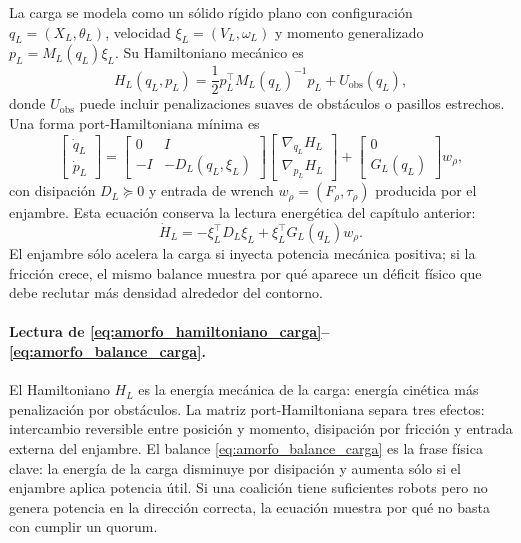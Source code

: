La carga se modela como un sólido rígido plano con configuración
$q_L=(X_L,\theta_L)$, velocidad $\xi_L=(V_L,\omega_L)$ y momento generalizado
$p_L=M_L(q_L)\xi_L$. Su Hamiltoniano mecánico es
\begin{equation}
  H_L(q_L,p_L)=\frac12p_L^\top M_L(q_L)^{-1}p_L+U_{\mathrm{obs}}(q_L),
  \label{eq:amorfo_hamiltoniano_carga}
\end{equation}
donde $U_{\mathrm{obs}}$ puede incluir penalizaciones suaves de obstáculos o pasillos
estrechos. Una forma port-Hamiltoniana mínima es
\begin{equation}
  \begin{bmatrix}\dot q_L\\ \dot p_L\end{bmatrix}
  =
  \left[
  \begin{array}{cc}
    0&I\\ -I&-D_L(q_L,\xi_L)
  \end{array}
  \right]
  \begin{bmatrix}
    \nabla_{q_L}H_L\\ \nabla_{p_L}H_L
  \end{bmatrix}
  +
  \begin{bmatrix}0\\G_L(q_L)\end{bmatrix}w_\rho ,
  \label{eq:amorfo_ph_carga}
\end{equation}
con disipación $D_L\succeq0$ y entrada de wrench $w_\rho=(F_\rho,\tau_\rho)$ producida
por el enjambre. Esta ecuación conserva la lectura energética del capítulo anterior:
\begin{equation}
  \dot H_L
  =
  -\xi_L^\top D_L\xi_L+\xi_L^\top G_L(q_L)w_\rho .
  \label{eq:amorfo_balance_carga}
\end{equation}
El enjambre sólo acelera la carga si inyecta potencia mecánica positiva; si la fricción
crece, el mismo balance muestra por qué aparece un déficit físico que debe reclutar más
densidad alrededor del contorno.

\paragraph{Lectura de \eqref{eq:amorfo_hamiltoniano_carga}--\eqref{eq:amorfo_balance_carga}.}
El Hamiltoniano $H_L$ es la energía mecánica de la carga: energía cinética más penalización
por obstáculos. La matriz port-Hamiltoniana separa tres efectos: intercambio reversible
entre posición y momento, disipación por fricción y entrada externa del enjambre. El
balance \eqref{eq:amorfo_balance_carga} es la frase física clave: la energía de la carga
disminuye por disipación y aumenta sólo si el enjambre aplica potencia útil. Si una
coalición tiene suficientes robots pero no genera potencia en la dirección correcta, la
ecuación muestra por qué no basta con cumplir un quorum.

